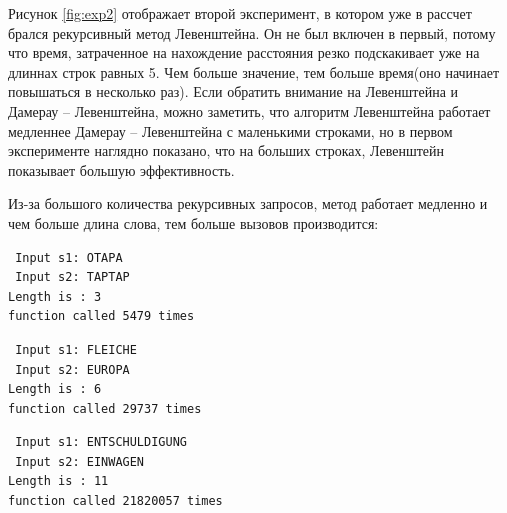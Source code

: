 Рисунок \ref{fig:exp2} отображает второй эксперимент, в котором уже в рассчет брался рекурсивный метод Левенштейна. Он не был включен в первый, потому что время, затраченное на нахождение расстояния резко подскакивает уже на длиннах строк равных 5. Чем больше значение, тем больше время(оно начинает повышаться в несколько раз). Если обратить внимание на Левенштейна и Дамерау -- Левенштейна, можно заметить, что алгоритм Левенштейна работает медленнее Дамерау -- Левенштейна с маленькими строками, но в первом эксперименте наглядно показано, что на больших строках, Левенштейн показывает большую эффективность.

\begin{figure}[ht!]
\end{figure}

Из-за большого количества рекурсивных запросов, метод работает медленно и чем больше длина слова, тем больше вызовов производится:

\begin{lstlisting}
 Input s1: OTAPA
 Input s2: TAPTAP
Length is : 3
function called 5479 times
\end{lstlisting}

\begin{lstlisting}
 Input s1: FLEICHE
 Input s2: EUROPA
Length is : 6
function called 29737 times
\end{lstlisting}

\begin{lstlisting}
 Input s1: ENTSCHULDIGUNG
 Input s2: EINWAGEN
Length is : 11
function called 21820057 times
\end{lstlisting}


